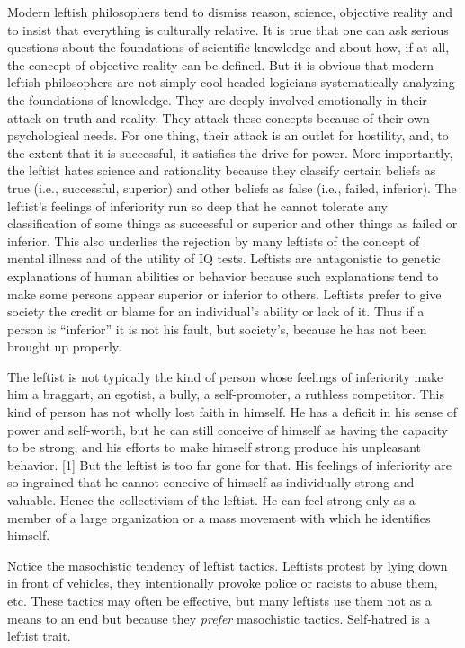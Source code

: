  Modern leftish philosophers tend to dismiss reason, science, objective reality and to insist that everything is culturally relative. It is true that one can ask serious questions about the foundations of scientific knowledge and about how, if at all, the concept of objective reality can be defined. But it is obvious that modern leftish philosophers are not simply cool-headed logicians systematically analyzing the foundations of knowledge. They are deeply involved emotionally in their attack on truth and reality. They attack these concepts because of their own psychological needs. For one thing, their attack is an outlet for hostility, and, to the extent that it is successful, it satisfies the drive for power. More importantly, the leftist hates science and rationality because they classify certain beliefs as true (i.e., successful, superior) and other beliefs as false (i.e., failed, inferior). The leftist’s feelings of inferiority run so deep that he cannot tolerate any classification of some things as successful or superior and other things as failed or inferior. This also underlies the rejection by many leftists of the concept of mental illness and of the utility of IQ tests. Leftists are antagonistic to genetic explanations of human abilities or behavior because such explanations tend to make some persons appear superior or inferior to others. Leftists prefer to give society the credit or blame for an individual’s ability or lack of it. Thus if a person is “inferior” it is not his fault, but society’s, because he has not been brought up properly.

 The leftist is not typically the kind of person whose feelings of inferiority make him a braggart, an egotist, a bully, a self-promoter, a ruthless competitor. This kind of person has not wholly lost faith in himself. He has a deficit in his sense of power and self-worth, but he can still conceive of himself as having the capacity to be strong, and his efforts to make himself strong produce his unpleasant behavior. [1] But the leftist is too far gone for that. His feelings of inferiority are so ingrained that he cannot conceive of himself as individually strong and valuable. Hence the collectivism of the leftist. He can feel strong only as a member of a large organization or a mass movement with which he identifies himself.

 Notice the masochistic tendency of leftist tactics. Leftists protest by lying down in front of vehicles, they intentionally provoke police or racists to abuse them, etc. These tactics may often be effective, but many leftists use them not as a means to an end but because they {\em prefer} masochistic tactics. Self-hatred is a leftist trait.

